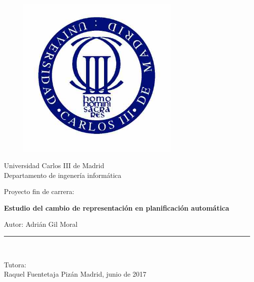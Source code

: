 \documentclass{article}
\begin{document}
    
    \frontmatter
    
    \begin{titlepage}
    
    \begin{center}
    \vspace*{-1in}
    \begin{figure}[htb]
    \begin{center}
    \bigbreak \bigbreak \bigbreak \bigbreak
    \includegraphics[width=8cm]{uc3mLogo}
    \end{center}
    \end{figure}
    
    Universidad Carlos III de Madrid\\
    \vspace*{0.15in}
    Departamento de ingenería informática \\
    \vspace*{0.6in}
    \begin{large}
    Proyecto fin de carrera:\\
    \end{large}
    \vspace*{0.2in}
    \begin{Large}
    \textbf{Estudio del cambio de representación en planificación automática} \\
    \end{Large}
    \vspace*{0.3in}
    \begin{large}
    Autor: Adrián Gil Moral\\
    \end{large}
    \vspace*{0.3in}
    \rule{80mm}{0.1mm}\\
    \vspace*{0.1in}
    \begin{large}
    Tutora: \\
    Raquel Fuentetaja Pizán \bigbreak \bigbreak \bigbreak \bigbreak \bigbreak \bigbreak \bigbreak \bigbreak \bigbreak \bigbreak \bigbreak
    Madrid, junio de 2017
    \end{large}
    
    \end{center}
    
    \end{titlepage}
    
\end{document}
